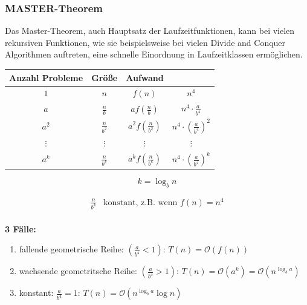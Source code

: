 \newpage
\subsubsection*{MASTER-Theorem}
Das Master-Theorem, auch Hauptsatz der Laufzeitfunktionen, kann bei vielen rekursiven Funktionen, wie sie beispielsweise bei vielen Divide and Conquer Algorithmen auftreten, eine schnelle Einordnung in Laufzeitklassen ermöglichen.\\
\begin{center}
\begin{tabular}{|c|c|c|c|}
    \hline
    Anzahl Probleme& Größe & Aufwand&\\
    \hline
    $1$&$n$&$f(n)$&$n^4$\\
    $a$&$\frac{n}{b}$&$af(\frac{n}{b})$&$n^4\cdot \frac{a}{b^4}$\\
    $a^2$&$\frac{n}{b^2}$&$a^2f(\frac{n}{b^2})$&$n^4\cdot (\frac{a}{b^4})^2$\\
    $\vdots$&$\vdots$&$\vdots$&$\vdots$\\
    $a^k$&$\frac{n}{b^k}$&$a^kf(\frac{n}{b^k})$&$n^4\cdot (\frac{a}{b^4})^k$\\
    \hline
\end{tabular}
$$k=\log_b n$$
\end{center}
\begin{align*}
    \frac{n}{b^k}& \text{konstant, z.B. wenn }f(n) = n^4\\
\end{align*}

\textbf{3 Fälle:}\\
\begin{enumerate}
\item fallende geometrische Reihe: $(\frac{a}{b^4}<1)$: $T(n) = \mathcal{O}(f(n))$\\
\item wachsende geometritsche Reihe: $(\frac{a}{b^4}>1)$: $T(n) = \mathcal{O} (a^k) = \mathcal{O}(n^{\log_b a})$\\
\item konstant: $\frac{a}{b^4} = 1$: $T(n) = \mathcal{O}(n^{\log_b a} \log n)$\\
\end{enumerate}
